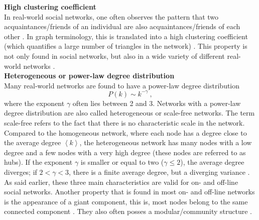 \documentclass[11 pt , letterpaper , twoside , openright]{book}
\begin{document}
\newline
\textbf{High clustering coefficient}\\
\newline
In real-world social networks, one often observes the pattern that two acquaintances/friends of an individual are also acquaintances/friends of each other \cite{RealWorld}. In graph terminology, this is translated into a high clustering coefficient (which quantifies a large number of triangles in the network) \cite{RealWorld}. This property is not only found in social networks, but also in a wide variety of different real-world networks \cite{RealWorld}.\\
\newline
\textbf{Heterogeneous or power-law degree distribution}\\
\newline
Many real-world networks are found to have a power-law degree distribution \cite{RealWorld}
\begin{equation}
	P(k) \sim k^{-\gamma} \ ,
\end{equation}
where the exponent $\gamma$ often lies between 2 and 3. Networks with a power-law degree distribution are also called heterogeneous or scale-free networks. The term scale-free refers to the fact that there is no characteristic scale in the network. Compared to the homogeneous network, where each node has a degree close to the average degree $\left<k\right>$, the heterogeneous network has many nodes with a low degree and a few nodes with a very high degree (these nodes are referred to as hubs). If the exponent $\gamma$ is smaller or equal to two ($\gamma \leqslant 2$), the average degree diverges; if $2 < \gamma < 3$, there is a finite average degree, but a diverging variance \cite{Newman2005}.\\
\newline
As said earlier, these three main characteristics are valid for on- and off-line social networks. Another property that is found in most on- and off-line networks is the appearance of a giant component, this is, most nodes belong to the same connected component \cite{Latapy}. They also often posses a modular/community structure \cite{Ferrara2012}\cite{McGlohon2011}. \\
\end{document}
